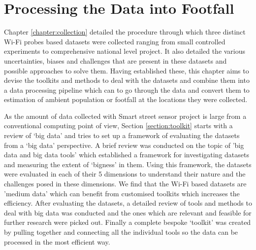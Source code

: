 \chapter{Processing the Data into Footfall} \label{chapter:processing}

Chapter \ref{chapter:collection} detailed the procedure through which three distinct Wi-Fi probes based datasets were collected ranging from small controlled experiments to comprehensive national level project.
It also detailed the various uncertainties, biases and challenges that are present in these datasets and possible approaches to solve them.
Having established these, this chapter aims to devise the toolkits and methods to deal with the datasets and combine them into a data processing pipeline which can to go through the data and convert them to estimation of ambient population or footfall at the locations they were collected.

As the amount of data collected with Smart street sensor project is large from a conventional computing point of view, Section \ref{section:toolkit} starts with a review of `big data' and tries to set up a framework of evaluating the datasets from a `big data' perspective.
A brief review was conducted on the topic of 'big data and big data tools' which established a framework for investigating datasets and measuring the extent of 
`bigness' in them.
Using this framework, the datasets were evaluated in each of their 5 dimensions to understand their nature and the challenges posed in these dimensions.
We find that the Wi-Fi based datasets are 'medium data' which can benefit from customised toolkits which increases the efficiency.
After evaluating the datasets, a detailed review of tools and methods to deal with big data was conducted and the ones which are relevant and feasible for further research were picked out.
Finally a complete bespoke `toolkit' was created by pulling together and connecting all the individual tools so the data can be processed in the most efficient way.

